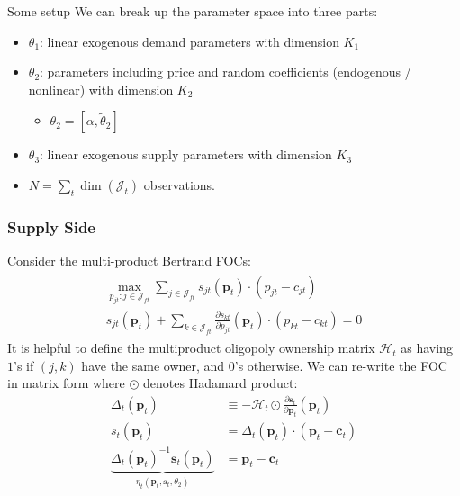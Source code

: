 \begin{frame}{Some setup}
We can break up the parameter space into three parts:
\begin{itemize}
\item $\theta_1$: linear exogenous demand parameters with dimension $K_1$
 \item $\theta_2$: parameters including price and random coefficients (endogenous / nonlinear) with dimension $K_2$
 \begin{itemize}
 \item $\theta_2 = [\alpha, \widetilde{\theta}_2]$
\end{itemize}
 \item $\theta_3$: linear exogenous supply parameters with dimension $K_3$
 \item $N = \sum_{t} \dim(\mathcal{J}_t)$ observations.
\end{itemize}
\end{frame}



\begin{frame}[plain]
\frametitle{Supply Side}
\footnotesize
Consider the multi-product Bertrand FOCs:
\begin{align*}
\begin{array}{c}
\max _{p_{j t}: j \in \mathcal{J}_{f t}} \sum_{j \in \mathcal{J}_{f t}} s_{j t}\left(\boldsymbol{p}_{t}\right) \cdot\left(p_{j t}-c_{j t}\right) \\
s_{j t}\left(\boldsymbol{p}_{t}\right)+\sum_{k \in \mathcal{J}_{f t}} \frac{\partial s_{k t}}{\partial p_{j t}}\left(\boldsymbol{p}_{t}\right) \cdot\left(p_{k t}-c_{k t}\right)=0
\end{array}
\end{align*}
It is helpful to define the \alert{multiproduct oligopoly ownership matrix} $\mathcal{H}_t$ as having $1$'s if $(j,k)$ have the same owner, and $0$'s otherwise. We can re-write the FOC in matrix form where $\odot$ denotes Hadamard product:
\begin{align*}
\Delta_{t}\left(\boldsymbol{p}_{t}\right) &\equiv-\mathcal{H}_{t} \odot \frac{\partial \boldsymbol{s}_{t}}{\partial \boldsymbol{p}_{t}}\left(\boldsymbol{p}_{t}\right)\\
s_{t}\left(\boldsymbol{p}_{t}\right) &=\Delta_{t}\left(\boldsymbol{p}_{t}\right) \cdot\left(\boldsymbol{p}_{t}-\boldsymbol{c}_{t}\right) \\
\underbrace{\Delta_{t}\left(\boldsymbol{p}_{t}\right)^{-1} \boldsymbol{s}_{t}\left(\boldsymbol{p}_{t}\right)}_{\eta_{t}\left(\boldsymbol{p}_{t}, \boldsymbol{s}_{t}, \theta_{2}\right)} &=\boldsymbol{p}_{t}-\boldsymbol{c}_{t}
\end{align*}
\end{frame}



